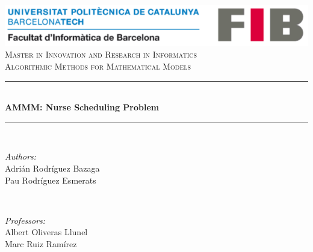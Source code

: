 \documentclass[a4paper]{article}
\begin{document}
\begin{titlepage}

\newcommand{\HRule}{\rule{\linewidth}{0.5mm}} 							%
\newenvironment{bottompar}{\par\vspace*{\fill}}{\clearpage}
\center 
\begin{center}
\includegraphics[scale=0.8]{upclogo.png}\\[2cm] %
 
\textsc{\Large Master in Innovation and Research in Informatics}\\[0.5cm] %
\textsc{\large Algorithmic Methods for Mathematical Models}\\[5cm] %


\HRule \\[0.4cm]
{ \huge \bfseries AMMM: Nurse Scheduling Problem}\\[0.4cm] %
\HRule \\[1.5cm]
 
\begin{bottompar}
\begin{minipage}{0.5\textwidth}
\begin{flushleft} \large
\emph{Authors:}\\
Adrián Rodríguez Bazaga \\ Pau Rodríguez Esmerats %
\end{flushleft}
\end{minipage}
~
\begin{minipage}{0.4\textwidth}
\begin{flushright} \large
\emph{Professors:} \\
Albert Oliveras Llunel \\ Marc Ruiz Ramírez %
\end{flushright}
\end{minipage}\\[2cm]


\end{bottompar}
\end{center}
\end{titlepage}
\end{document}
